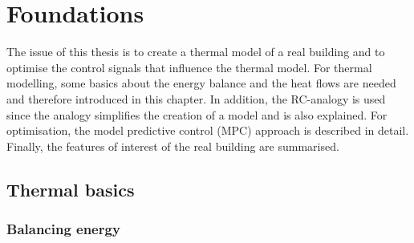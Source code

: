 \chapter{Foundations}
\label{ch:foundations}
The issue of this thesis is to create a thermal model of a real building and to optimise the control signals that influence the thermal model. For thermal modelling, some basics about the energy balance and the heat flows are needed and therefore introduced in this chapter. In addition, the RC-analogy is used since the analogy simplifies the creation of a model and is also explained. For optimisation, the model predictive control (MPC) approach is described in detail. Finally, the features of interest of the real building are summarised. 

\section{Thermal basics}
\label{section:thermalbasics}

\subsection{Balancing energy}
\label{subsection:balancing energy}

